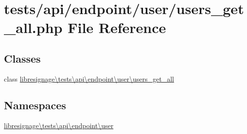 \hypertarget{tests_2api_2endpoint_2user_2users__get__all_8php}{}\section{tests/api/endpoint/user/users\+\_\+get\+\_\+all.php File Reference}
\label{tests_2api_2endpoint_2user_2users__get__all_8php}
\subsection*{Classes}
\begin{DoxyCompactItemize}
\item 
class \hyperlink{classlibresignage_1_1tests_1_1api_1_1endpoint_1_1user_1_1users__get__all}{libresignage\textbackslash{}tests\textbackslash{}api\textbackslash{}endpoint\textbackslash{}user\textbackslash{}users\+\_\+get\+\_\+all}
\end{DoxyCompactItemize}
\subsection*{Namespaces}
\begin{DoxyCompactItemize}
\item 
 \hyperlink{namespacelibresignage_1_1tests_1_1api_1_1endpoint_1_1user}{libresignage\textbackslash{}tests\textbackslash{}api\textbackslash{}endpoint\textbackslash{}user}
\end{DoxyCompactItemize}
